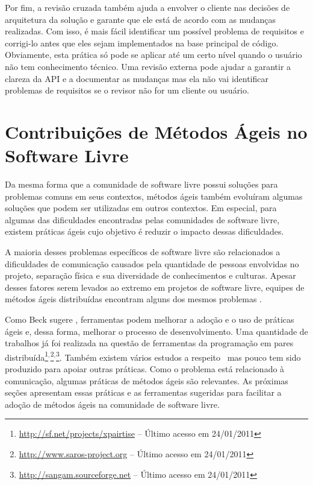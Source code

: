 Por fim, a revisão cruzada também ajuda a envolver o cliente nas
decisões de arquitetura da solução e garante que ele está de acordo
com as mudanças realizadas. Com isso, é mais fácil identificar um
possível problema de requisitos e corrigi-lo antes que eles sejam
implementados na base principal de código. Obviamente, esta prática só
pode se aplicar até um certo nível quando o usuário não tem
conhecimento técnico. Uma revisão externa pode ajudar a garantir a
clareza da API e a documentar as mudanças mas ela não vai identificar
problemas de requisitos se o revisor não for um cliente ou usuário.

\section{Contribuições de Métodos Ágeis no Software Livre}
\label{sec:agile-improve-os}

Da mesma forma que a comunidade de software livre possui soluções para
problemas comuns em seus contextos, métodos ágeis também evoluíram
algumas soluções que podem ser utilizadas em outros contextos. Em
especial, para algumas das dificuldades encontradas pelas comunidades
de software livre, existem práticas ágeis cujo objetivo é reduzir o
impacto dessas dificuldades.

A maioria desses problemas específicos de software livre são
relacionados a dificuldades de comunicação causados pela quantidade de
pessoas envolvidas no projeto, separação física e sua diversidade de
conhecimentos e culturas. Apesar desses fatores serem levados ao
extremo em projetos de software livre, equipes de métodos ágeis
distribuídas encontram alguns dos mesmos problemas
\cite{Sutherland2007,Maurer2002}.

Como Beck sugere \cite{Beck2008}, ferramentas podem melhorar a adoção
e o uso de práticas ágeis e, dessa forma, melhorar o processo de
desenvolvimento. Uma quantidade de trabalhos já foi
realizada na questão de ferramentas da programação em pares
distribuída\footnote{\url{http://sf.net/projects/xpairtise} -- Último
  acesso em
  24/01/2011}$^{,}$\footnote{\url{http://www.saros-project.org} --
  Último acesso em
  24/01/2011}$^{,}$\footnote{\url{http://sangam.sourceforge.net} --
  Último acesso em 24/01/2011}. Também existem vários estudos a
respeito~\cite{Nagappan2003} mas pouco tem sido produzido para apoiar
outras práticas. Como o problema está relacionado à comunicação,
algumas práticas de métodos ágeis são relevantes. As próximas
seções apresentam essas práticas e as ferramentas sugeridas
para facilitar a adoção de métodos ágeis na comunidade de software
livre.

